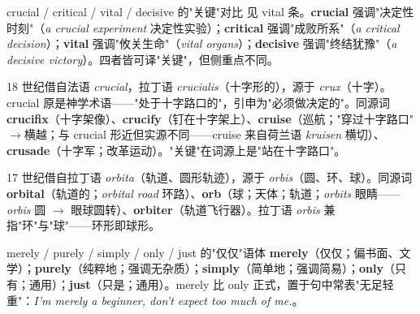 \documentclass[../main.tex]{subfiles}
\begin{document}
\begin{lex}{crucial / critical / vital / decisive 的"关键"对比}
见 vital 条。\textbf{crucial} 强调"决定性时刻"（\textit{a crucial experiment} 决定性实验）；\textbf{critical} 强调"成败所系"（\textit{a critical decision}）；\textbf{vital} 强调"攸关生命"（\textit{vital organs}）；\textbf{decisive} 强调"终结犹豫"（\textit{a decisive victory}）。四者皆可译"关键"，但侧重点不同。
\end{lex}

\begin{origin}
18 世纪借自法语 \textit{crucial}，拉丁语 \textit{crucialis}（十字形的），源于 \textit{crux}（十字）。crucial 原是神学术语——"处于十字路口的"，引申为"必须做决定的"。同源词 \textbf{crucifix}（十字架像）、\textbf{crucify}（钉在十字架上）、\textbf{cruise}（巡航；"穿过十字路口"$\to$横越；与 crucial 形近但实源不同——cruise 来自荷兰语 \textit{kruisen} 横切）、\textbf{crusade}（十字军；改革运动）。"关键"在词源上是"站在十字路口"。
\end{origin}




\begin{origin}
17 世纪借自拉丁语 \textit{orbita}（轨道、圆形轨迹），源于 \textit{orbis}（圆、环、球）。同源词 \textbf{orbital}（轨道的；\textit{orbital road} 环路）、\textbf{orb}（球；天体；轨道；\textit{orbits} 眼睛——\textit{orbis} 圆 $\to$ 眼球圆转）、\textbf{orbiter}（轨道飞行器）。拉丁语 \textit{orbis} 兼指"环"与"球"——环形即球形。
\end{origin}



\begin{gram}{merely / purely / simply / only / just 的"仅仅"语体}
\textbf{merely}（仅仅；偏书面、文学）；\textbf{purely}（纯粹地；强调无杂质）；\textbf{simply}（简单地；强调简易）；\textbf{only}（只有；通用）；\textbf{just}（只是；通用）。merely 比 only 正式，置于句中常表"无足轻重"：\textit{I'm merely a beginner, don't expect too much of me.}。
\end{gram}
\end{document}
